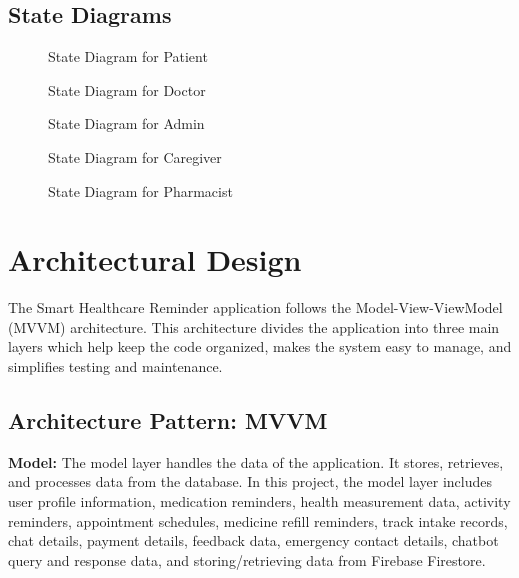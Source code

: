 \documentclass[12pt, a4paper, oneside]{report}
\begin{document}
\subsection{State Diagrams}

\begin{figure}[H]
\centering
\caption{State Diagram for Patient}
\label{fig:state-patient}
\end{figure}

\begin{figure}[H]
\centering
\caption{State Diagram for Doctor}
\label{fig:state-doctor}
\end{figure}

\begin{figure}[H]
\centering
\caption{State Diagram for Admin}
\label{fig:state-admin}
\end{figure}

\begin{figure}[H]
\centering
\caption{State Diagram for Caregiver}
\label{fig:state-caregiver}
\end{figure}

\begin{figure}[H]
\centering
\caption{State Diagram for Pharmacist}
\label{fig:state-pharmacist}
\end{figure}

\section{Architectural Design}

The Smart Healthcare Reminder application follows the Model-View-ViewModel (MVVM) architecture. This architecture divides the application into three main layers which help keep the code organized, makes the system easy to manage, and simplifies testing and maintenance.

\subsection{Architecture Pattern: MVVM}

\textbf{Model:} The model layer handles the data of the application. It stores, retrieves, and processes data from the database. In this project, the model layer includes user profile information, medication reminders, health measurement data, activity reminders, appointment schedules, medicine refill reminders, track intake records, chat details, payment details, feedback data, emergency contact details, chatbot query and response data, and storing/retrieving data from Firebase Firestore.
\end{document}
